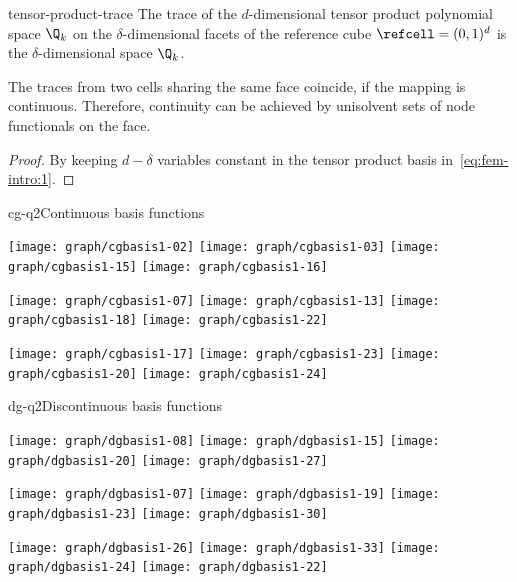 \begin{Lemma}{tensor-product-trace}
  The trace of the $d$-dimensional tensor product polynomial space
  $\Q_k$ on the $\delta$-dimensional facets of the reference cube
  $\refcell = (0,1)^d$ is the $\delta$-dimensional space $\Q_k$.

  The traces from two cells sharing the same face coincide, if the
  mapping is continuous. Therefore, continuity can be achieved by
  unisolvent sets of node functionals on the face.
\end{Lemma}

\begin{proof}
  By keeping $d-\delta$ variables constant in the tensor product basis
  in~\eqref{eq:fem-intro:1}.
\end{proof}

\begin{Example*}{cg-q2}{Continuous basis functions}
  \begin{center}
    \texttt{[image: graph/cgbasis1-02]}
    \texttt{[image: graph/cgbasis1-03]}
    \texttt{[image: graph/cgbasis1-15]}
    \texttt{[image: graph/cgbasis1-16]}

    \texttt{[image: graph/cgbasis1-07]}
    \texttt{[image: graph/cgbasis1-13]}
    \texttt{[image: graph/cgbasis1-18]}
    \texttt{[image: graph/cgbasis1-22]}

    \texttt{[image: graph/cgbasis1-17]}
    \texttt{[image: graph/cgbasis1-23]}
    \texttt{[image: graph/cgbasis1-20]}
    \texttt{[image: graph/cgbasis1-24]}
  \end{center}
\end{Example*}

\begin{Example*}{dg-q2}{Discontinuous basis functions}
  \begin{center}
    \texttt{[image: graph/dgbasis1-08]}
    \texttt{[image: graph/dgbasis1-15]}
    \texttt{[image: graph/dgbasis1-20]}
    \texttt{[image: graph/dgbasis1-27]}

    \texttt{[image: graph/dgbasis1-07]}
    \texttt{[image: graph/dgbasis1-19]}
    \texttt{[image: graph/dgbasis1-23]}
    \texttt{[image: graph/dgbasis1-30]}

    \texttt{[image: graph/dgbasis1-26]}
    \texttt{[image: graph/dgbasis1-33]}
    \texttt{[image: graph/dgbasis1-24]}
    \texttt{[image: graph/dgbasis1-22]}
  \end{center}
\end{Example*}

